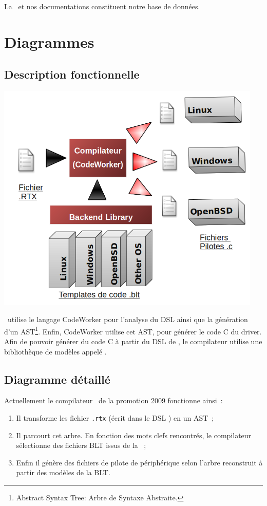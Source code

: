 \documentclass{rtxreport}
\begin{document}
La \BL\ et nos documentations constituent notre base de données.

\chapter{Diagrammes}

\section{Description fonctionnelle}

\includegraphics[width=0.95\textwidth]{diagramme_general}

\rtx\ utilise le langage CodeWorker\cite{CodeWorker} pour l'analyse du DSL ainsi
que la génération d'un AST\footnote{Abstract Syntax Tree: Arbre de Syntaxe
Abstraite.}. Enfin, CodeWorker utilise cet AST, pour générer le code C du
driver. Afin de pouvoir générer du code C à partir du DSL de \rtx, le
compilateur utilise une bibliothèque de modèles appelé \BL.

\section{Diagramme détaillé}

Actuellement le compilateur \rtx\ de la promotion 2009 fonctionne ainsi~:
\begin{enumerate}
\item Il transforme les fichier \texttt{.rtx} (écrit dans le DSL \rtx) en un AST~;
\item Il parcourt cet arbre. En fonction des mots clefs rencontrés, le
compilateur sélectionne des fichiers BLT issus de la \BL~;
\item Enfin il génère des fichiers de pilote de périphérique selon l'arbre
reconstruit à partir des modèles de la BLT.
\end{enumerate}
\end{document}
